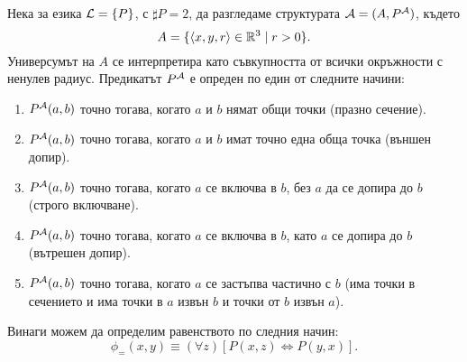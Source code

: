 \begin{problem}
  Нека за езика $\mathcal{L} = \{P\}$, с $\sharp P = 2$, да разгледаме структурата $\mathcal{A} = (A,P^{\mathcal{A}})$, където
  \[A = \{\langle{x,y,r}\rangle \in \mathbb{R}^3 \mid r >0\}.\]
  Универсумът на $A$ се интерпретира като съвкупността от всички окръжности с ненулев радиус.
  Предикатът $P^{\mathcal{A}}$ е опреден по един от следните начини:
  \begin{enumerate}[1)]
  \item
    $P^{\mathcal{A}}(a,b)$ точно тогава, когато $a$ и $b$ нямат общи точки (празно сечение).
  \item
    $P^{\mathcal{A}}(a,b)$ точно тогава, когато $a$ и $b$ имат точно една обща точка (външен допир).
  \item
    $P^{\mathcal{A}}(a,b)$ точно тогава, когато $a$ се включва в $b$, без $a$ да се допира до $b$ (строго включване).
  \item
    $P^{\mathcal{A}}(a,b)$ точно тогава, когато $a$ се включва в $b$, като $a$ се допира до $b$ (вътрешен допир).
  \item
    $P^{\mathcal{A}}(a,b)$ точно тогава, когато $a$ се застъпва частично с $b$ (има точки в сечението и има точки в $a$ извън $b$ и точки от $b$ извън $a$).
  \end{enumerate}
    
\end{problem}
\begin{hint}
  Винаги можем да определим равенството по следния начин:
  \[\phi_{=}(x,y) \equiv (\forall z)[P(x,z) \iff P(y,x)].\]
\end{hint}

